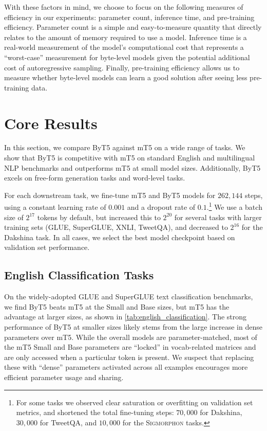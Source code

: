 \documentclass[11pt,a4paper]{article}
\begin{document}
With these factors in mind, we choose to focus on the following measures of efficiency in our experiments: parameter count, inference time, and pre-training efficiency.
Parameter count is a simple and easy-to-measure quantity that directly relates to the amount of memory required to use a model.
Inference time is a real-world measurement of the model's computational cost that represents a ``worst-case'' measurement for byte-level models given the potential additional cost of autoregressive sampling.
Finally, pre-training efficiency allows us to measure whether byte-level models can learn a good solution after seeing less pre-training data.

\section{Core Results}
\label{sec:core_results}

In this section, we compare ByT5 against mT5 on a wide range of tasks. We show that ByT5 is competitive with mT5 on standard English and multilingual NLP benchmarks and outperforms mT5 at small model sizes. Additionally, ByT5 excels on free-form generation tasks and word-level tasks.

For each downstream task, we fine-tune mT5 and ByT5 models for $262{,}144$ steps, using a constant learning rate of $0.001$ and a dropout rate of $0.1$.\footnote{For some tasks we observed clear saturation or overfitting on validation set metrics, and shortened the total fine-tuning steps: $70{,}000$ for Dakshina, $30{,}000$ for TweetQA, and $10{,}000$ for the \textsc{Sigmorphon} tasks.} We use a batch size of $2^{17}$ tokens by default, but increased this to $2^{20}$ for several tasks with larger training sets (GLUE, SuperGLUE, XNLI, TweetQA), and decreased to $2^{16}$ for the Dakshina task. In all cases, we select the best model checkpoint based on validation set performance.

\subsection{English Classification Tasks}



On the widely-adopted GLUE \cite{wang2019glue} and SuperGLUE \cite{wang2019superglue} text classification benchmarks, we find ByT5 beats mT5 at the Small and Base sizes, but mT5 has the advantage at larger sizes, as shown in \cref{tab:english_classification}. The strong performance of ByT5 at smaller sizes likely stems from the large increase in dense parameters over mT5. While the overall models are parameter-matched, most of the mT5 Small and Base parameters are ``locked'' in vocab-related matrices and are only accessed when a particular token is present. We suspect that replacing these with ``dense'' parameters activated across all examples encourages more efficient parameter usage and sharing.
\end{document}
